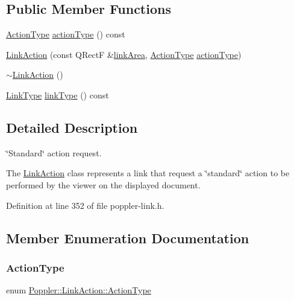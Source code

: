 \subsection*{Public Member Functions}
\begin{DoxyCompactItemize}
\item 
\hyperlink{class_poppler_1_1_link_action_af9c6ee08681c0993083a6f817f9d099c}{Action\+Type} \hyperlink{class_poppler_1_1_link_action_aed2145fc91e2ff0a3339cb9c3cbb0d3b}{action\+Type} () const
\item 
\hyperlink{class_poppler_1_1_link_action_a166c89b82bca185dec243b9ff2c09103}{Link\+Action} (const Q\+RectF \&\hyperlink{class_poppler_1_1_link_adb525b65cfac39dcdba3f59faa57a0bf}{link\+Area}, \hyperlink{class_poppler_1_1_link_action_af9c6ee08681c0993083a6f817f9d099c}{Action\+Type} \hyperlink{class_poppler_1_1_link_action_aed2145fc91e2ff0a3339cb9c3cbb0d3b}{action\+Type})
\item 
\hyperlink{class_poppler_1_1_link_action_a3d542d57f2ce813e5d275da4c9d7e140}{$\sim$\+Link\+Action} ()
\item 
\hyperlink{class_poppler_1_1_link_af0dacfa77a548bb043dbae4bb9dc6c1e}{Link\+Type} \hyperlink{class_poppler_1_1_link_action_a20ec1a625cb94bb9a44f5399c6a5b9fd}{link\+Type} () const
\end{DoxyCompactItemize}


\subsection{Detailed Description}
\char`\"{}\+Standard\char`\"{} action request. 

The \hyperlink{class_poppler_1_1_link_action}{Link\+Action} class represents a link that request a \char`\"{}standard\char`\"{} action to be performed by the viewer on the displayed document. 

Definition at line 352 of file poppler-\/link.\+h.



\subsection{Member Enumeration Documentation}
\mbox{\label{class_poppler_1_1_link_action_af9c6ee08681c0993083a6f817f9d099c}} 
\subsubsection{\texorpdfstring{Action\+Type}{ActionType}}
{\footnotesize\ttfamily enum \hyperlink{class_poppler_1_1_link_action_af9c6ee08681c0993083a6f817f9d099c}{Poppler\+::\+Link\+Action\+::\+Action\+Type}}

